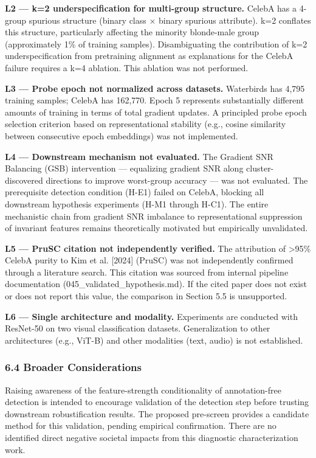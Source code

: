 \textbf{L2 — k=2 underspecification for multi-group structure.} CelebA has a 4-group spurious structure (binary class × binary spurious attribute). k=2 conflates this structure, particularly affecting the minority blonde-male group (approximately 1\% of training samples). Disambiguating the contribution of k=2 underspecification from pretraining alignment as explanations for the CelebA failure requires a k=4 ablation. This ablation was not performed.

\textbf{L3 — Probe epoch not normalized across datasets.} Waterbirds has 4,795 training samples; CelebA has 162,770. Epoch 5 represents substantially different amounts of training in terms of total gradient updates. A principled probe epoch selection criterion based on representational stability (e.g., cosine similarity between consecutive epoch embeddings) was not implemented.

\textbf{L4 — Downstream mechanism not evaluated.} The Gradient SNR Balancing (GSB) intervention — equalizing gradient SNR along cluster-discovered directions to improve worst-group accuracy — was not evaluated. The prerequisite detection condition (H-E1) failed on CelebA, blocking all downstream hypothesis experiments (H-M1 through H-C1). The entire mechanistic chain from gradient SNR imbalance to representational suppression of invariant features remains theoretically motivated but empirically unvalidated.

\textbf{L5 — PruSC citation not independently verified.} The attribution of >95\% CelebA purity to Kim et al. [2024] (PruSC) was not independently confirmed through a literature search. This citation was sourced from internal pipeline documentation (045_validated_hypothesis.md). If the cited paper does not exist or does not report this value, the comparison in Section 5.5 is unsupported.

\textbf{L6 — Single architecture and modality.} Experiments are conducted with ResNet-50 on two visual classification datasets. Generalization to other architectures (e.g., ViT-B) and other modalities (text, audio) is not established.

\subsubsection{6.4 Broader Considerations}

Raising awareness of the feature-strength conditionality of annotation-free detection is intended to encourage validation of the detection step before trusting downstream robustification results. The proposed pre-screen provides a candidate method for this validation, pending empirical confirmation. There are no identified direct negative societal impacts from this diagnostic characterization work.

